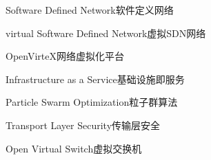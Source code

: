 

{Software Defined Network}{软件定义网络}

{virtual Software Defined Network}{虚拟SDN网络}

{OpenVirteX}{网络虚拟化平台}

{Infrastructure as a Service}{基础设施即服务}

{Particle Swarm Optimization}{粒子群算法}

{Transport Layer Security}{传输层安全}

{Open Virtual Switch}{虚拟交换机}